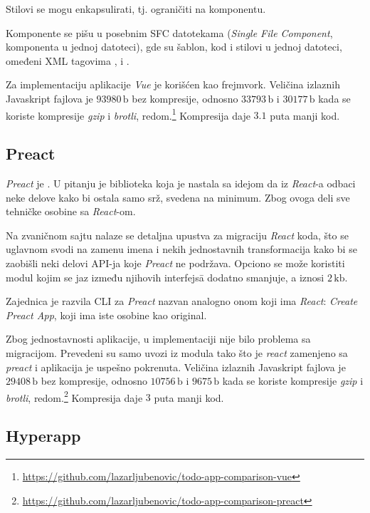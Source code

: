 Stilovi se mogu enkapsulirati, tj. ograničiti na komponentu.

Komponente se pišu u posebnim SFC datotekama (\textsl{Single File Component}, komponenta u jednoj datoteci), gde su šablon, kod i stilovi u jednoj datoteci, omeđeni XML tagovima ,  i .

Za implementaciju  aplikacije \textsl{Vue} je korišćen kao frejmvork.
Veličina izlaznih Javaskript fajlova je $93980\,\mathrm{b}$ bez kompresije, odnosno $33793\,\mathrm{b}$ i $30177\,\mathrm{b}$ kada se koriste kompresije \textsl{gzip} i \textsl{brotli}, redom.\footnote{\url{https://github.com/lazarljubenovic/todo-app-comparison-vue}} Kompresija daje $3.1$ puta manji kod.

\subsection{Preact}

\textsl{Preact} je .
U pitanju je biblioteka koja je nastala sa idejom da iz \textsl{React}-a odbaci neke delove kako bi ostala samo srž, svedena na minimum.
Zbog ovoga deli sve tehničke osobine sa \textsl{React}-om.

Na zvaničnom sajtu nalaze se detaljna upustva za migraciju \textsl{React} koda, što se uglavnom svodi na zamenu imena i nekih jednostavnih transformacija kako bi se zaobišli neki delovi API-ja koje \textsl{Preact} ne podržava.
Opciono se može koristiti modul  kojim se jaz između njihovih interfejs\=a dodatno smanjuje, a iznosi $2\,\mathrm{kb}$.

Zajednica je razvila CLI za \textsl{Preact} nazvan analogno onom koji ima \textsl{React}: \textsl{Create Preact App}, koji ima iste osobine kao original.

Zbog jednostavnosti  aplikacije, u implementaciji nije bilo problema sa migracijom.
Prevedeni su samo uvozi iz modula tako što je \textsl{react} zamenjeno sa \textsl{preact} i aplikacija je uspešno pokrenuta.
Veličina izlaznih Javaskript fajlova je $29408\,\mathrm{b}$ bez kompresije, odnosno $10756\,\mathrm{b}$ i $9675\,\mathrm{b}$ kada se koriste kompresije \textsl{gzip} i \textsl{brotli}, redom.\footnote{\url{https://github.com/lazarljubenovic/todo-app-comparison-preact}} Kompresija daje $3$ puta manji kod.

\subsection{Hyperapp}


